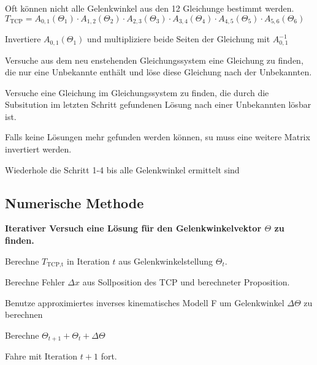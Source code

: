 Oft können nicht alle Gelenkwinkel aus den 12 Gleichunge bestimmt werden.
$T_{\text{TCP}} = A_{0,1}(\Theta_1) \cdot A_{1,2}(\Theta_2) \cdot A_{2,3}(\Theta_3)
 \cdot A_{3,4}(\Theta_4) \cdot A_{4,5}(\Theta_5) \cdot A_{5,6}(\Theta_6)$

 \begin{compactitem}
     \item Invertiere $A_{0,1}(\Theta_1)$ und multipliziere beide Seiten der Gleichung mit $A^{-1}_{0,1}$
     \item Versuche aus dem neu enstehenden Gleichungssystem eine Gleichung zu finden, die nur eine
     Unbekannte enthält und löse diese Gleichung nach der Unbekannten.
     \item Versuche eine Gleichung im Gleichungssystem zu finden, die durch die Subsitution im letzten
     Schritt gefundenen Lösung nach einer Unbekannten lösbar ist.
     \item Falls keine Lösungen mehr gefunden werden können, su muss eine weitere Matrix invertiert werden.
     \item Wiederhole die Schritt 1-4 bis alle Gelenkwinkel ermittelt sind
 \end{compactitem}

\subsection{Numerische Methode}
\textbf{Iterativer Versuch eine Lösung für den Gelenkwinkelvektor $\Theta$ zu finden.}
\begin{compactitem}
     \item Berechne $T_{\text{TCP,t}}$ in Iteration $t$ aus Gelenkwinkelstellung $\Theta_t$.
     \item Berechne Fehler $\Delta x$ aus Sollposition des TCP und berechneter Proposition.
     \item Benutze approximiertes inverses kinematisches Modell F um Gelenkwinkel $\Delta \Theta$
     zu berechnen
     \item Berechne $\Theta_{t+1} + \Theta_t + \Delta\Theta$
     \item Fahre mit Iteration $t+1$ fort.
 \end{compactitem}

